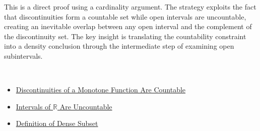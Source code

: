 \begin{remark*}
This is a direct proof using a cardinality argument. The strategy exploits the fact that discontinuities form a countable set while open intervals are uncountable, creating an inevitable overlap between any open interval and the complement of the discontinuity set. The key insight is translating the countability constraint into a density conclusion through the intermediate step of examining open subintervals.
\end{remark*}

\begin{remark*}[Dependencies]~\\
\begin{itemize}
  \item \hyperref[thm:monotone-discontinuities-countable]{Discontinuities of a Monotone Function Are Countable}
  \item \hyperref[thm:intervals-are-uncountable]{Intervals of $\mathbb{R}$ Are Uncountable}
  \item \hyperref[def:dense]{Definition of Dense Subset}
\end{itemize}
\end{remark*}
